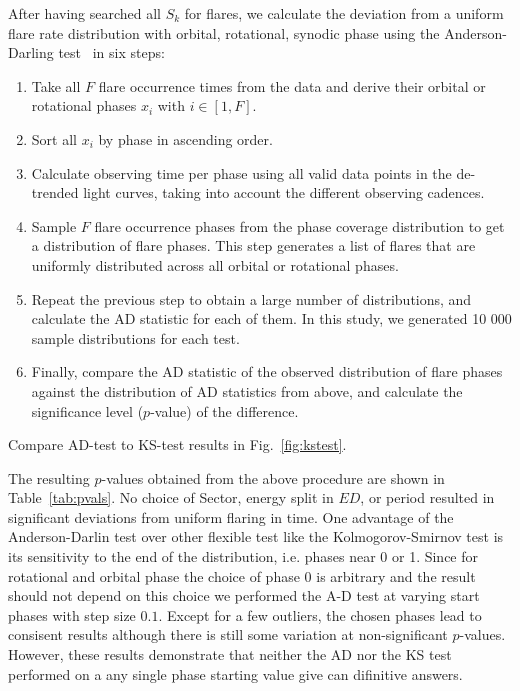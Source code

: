 \documentclass[fleqn,usenatbib,letters]{mnras}%
\begin{document}
After having searched all $S_k$ for flares, we calculate the deviation from a uniform flare rate distribution with orbital, rotational, synodic phase using the Anderson-Darling test~\citep{anderson1952, stephens2006} in six steps:
\begin{enumerate}
\item Take all $F$ flare occurrence times from the data and derive their orbital or rotational phases $x_i$ with $i \in [1,F]$. 
\item Sort all $x_i$ by phase in ascending order.
\item Calculate observing time per phase using all valid data points in the de-trended light curves, taking into account the different observing cadences.
\item Sample $F$ flare occurrence phases from the phase coverage distribution to get a distribution of flare phases. This step generates a list of flares that are uniformly distributed across all orbital or rotational phases.
\item Repeat the previous step to obtain a large number of distributions, and calculate the AD statistic for each of them.  In this study, we generated 10 000 sample distributions for each test.
\item Finally, compare the AD statistic of the observed distribution of flare phases against the distribution of AD statistics from above, and calculate the significance level ($p$-value) of the difference. 
\end{enumerate}

Compare AD-test to KS-test results in Fig.~\ref{fig:kstest}.

The resulting $p$-values obtained from the above procedure are shown in Table~\ref{tab:pvals}. No choice of Sector, energy split in $ED$, or period resulted in significant deviations from uniform flaring in time. One advantage of the Anderson-Darlin test over other flexible test like the Kolmogorov-Smirnov test is its sensitivity to the end of the distribution, i.e. phases near 0 or 1. Since for rotational and orbital phase the choice of phase 0 is arbitrary and the result should not depend on this choice we performed the A-D test at varying start phases with step size $0.1$. Except for a few outliers, the chosen phases lead to consisent results although there is still some variation at non-significant $p$-values. However, these results demonstrate that neither the AD nor the KS test performed on a any single phase starting value give can difinitive answers.
\end{document}
